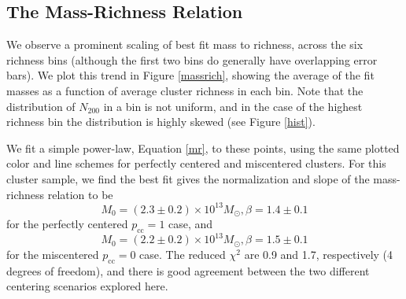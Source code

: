 \subsection{The Mass-Richness Relation}

We observe a prominent scaling of best fit mass to richness, across the six richness bins (although the first two bins do generally have overlapping error bars). We plot this trend in Figure \ref{massrich}, showing the average of the fit masses as a function of average cluster richness in each bin. Note that the distribution of $N_{200}$ in a bin is not uniform, and in the case of the highest richness bin the distribution is highly skewed (see Figure \ref{hist}).

We fit a simple power-law, Equation \ref{mr}, to these points, using the same plotted color and line schemes for perfectly centered and miscentered clusters. For this cluster sample, we find the best fit gives the normalization and slope of the mass-richness relation to be
\begin{equation}
M_0 = (2.3 \pm 0.2) \times 10^{13} M_\odot, \beta = 1.4 \pm 0.1
\end{equation}
for the perfectly centered $p_{\mathrm{cc}}=1$ case, and
\begin{equation}
M_0 = (2.2 \pm 0.2) \times 10^{13} M_\odot, \beta = 1.5 \pm 0.1
\end{equation}
for the miscentered $p_{\mathrm{cc}}=0$ case. The reduced $\chi^2$ are 0.9 and 1.7, respectively (4 degrees of freedom), and there is good agreement between the two different centering scenarios explored here.

